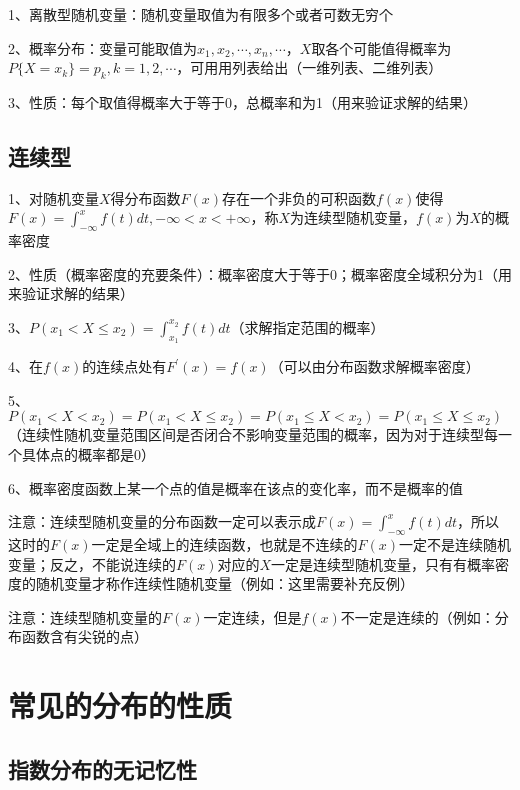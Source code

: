 1、离散型随机变量：随机变量取值为有限多个或者可数无穷个

2、概率分布：变量可能取值为$x_1,x_2,\cdots,x_n,\cdots$，$X$取各个可能值得概率为$P\{ X = x_k \} = p_k, k=1,2,\cdots$，可用用列表给出（一维列表、二维列表）

3、性质：每个取值得概率大于等于0，总概率和为1（用来验证求解的结果）



\subsection{连续型}

1、对随机变量$X$得分布函数$F(x)$存在一个非负的可积函数$f(x)$使得$F(x)=\int_{-\infty}^xf(t)dt,-\infty <x<+\infty$，称$X$为连续型随机变量，$f(x)$为$X$的概率密度

2、性质（概率密度的充要条件）：概率密度大于等于0；概率密度全域积分为1（用来验证求解的结果）

3、$P(x_1 < X \le x_2) = \int_{x_1}^{x_2}f(t)dt$（求解指定范围的概率）

4、在$f(x)$的连续点处有$F^{'}(x)=f(x)$（可以由分布函数求解概率密度）

5、$P(x_1 < X < x_2) = P(x_1 < X \le x_2) = P(x_1 \le X < x_2) = P(x_1 \le X \le x_2)$（连续性随机变量范围区间是否闭合不影响变量范围的概率，因为对于连续型每一个具体点的概率都是0）

6、概率密度函数上某一个点的值是概率在该点的变化率，而不是概率的值

注意：连续型随机变量的分布函数一定可以表示成$F(x)=\int_{-\infty}^xf(t)dt$，所以这时的$F(x)$一定是全域上的连续函数，也就是不连续的$F(x)$一定不是连续随机变量；反之，不能说连续的$F(x)$对应的$X$一定是连续型随机变量，只有有概率密度的随机变量才称作连续性随机变量（例如：这里需要补充反例）

注意：连续型随机变量的$F(x)$一定连续，但是$f(x)$不一定是连续的（例如：分布函数含有尖锐的点）



\section{常见的分布的性质}



\subsection{指数分布的无记忆性}

